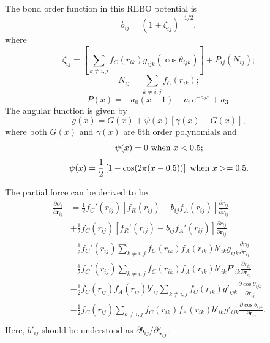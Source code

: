 \documentclass[12pt,a4paper]{report}
\newcommand{\vect}[1]{\boldsymbol{#1}}
\begin{document}
The bond order function in this REBO potential is
\begin{equation}
b_{ij} =\left(1 + \zeta_{ij}\right)^{-1/2},
\end{equation}
where
\begin{equation}
\zeta_{ij} = \left[ \sum_{k\neq i, j} f_C(r_{ik}) g_{ijk}(\cos\theta_{ijk}) \right] + P_{ij}(N_{ij});
\end{equation}
\begin{equation}
N_{ij} = \sum_{k\neq i,j} f_C(r_{ik});
\end{equation}
\begin{equation}
P(x) = -a_0(x-1) - a_1 e^{-a_2x}+a_3.
\end{equation}
The angular function  is given by
\begin{equation}
g(x)= G(x) + \psi(x) [ \gamma(x) - G(x)],
\end{equation}
where both $G(x)$ and $\gamma(x)$ are 6th order polynomials and
\begin{equation}
\psi(x)= 0 ~\textmd{when} ~x < 0.5;
\end{equation}
\begin{equation}
\psi(x)= \frac{1}{2} \left[ 1 - \cos(2\pi(x-0.5)) \right] ~ \textmd{when} ~x >= 0.5.
\end{equation}

The partial force can be derived to be
\begin{align}
\frac{\partial U_i}{\partial \vect{r}_{ij}}
&= \frac{1}{2}f_C'(r_{ij})[f_R(r_{ij})-b_{ij}f_A(r_{ij})]\frac{\partial r_{ij}}{\partial \vect{r}_{ij}} \nonumber \\
&+ \frac{1}{2}f_C(r_{ij})[f_R'(r_{ij})-b_{ij}f_A'(r_{ij})]\frac{\partial r_{ij}}{\partial \vect{r}_{ij}} \nonumber \\
&- \frac{1}{2}f_C'(r_{ij})\sum_{k\neq i,j}f_C(r_{ik})f_A(r_{ik})b'_{ik}g_{ijk} \frac{\partial r_{ij}}{\partial \vect{r}_{ij}} \nonumber \\
&- \frac{1}{2}f_C'(r_{ij})\sum_{k\neq i,j}f_C(r_{ik})f_A(r_{ik})b'_{ik}P'_{ik} \frac{\partial r_{ij}}{\partial \vect{r}_{ij}} \nonumber \\
&- \frac{1}{2}f_C(r_{ij})f_A(r_{ij})b'_{ij}\sum_{k\neq i,j}f_C(r_{ik})  g'_{ijk}
   \frac{\partial \cos\theta_{ijk}}{\partial \vect{r}_{ij}} \nonumber \\
&- \frac{1}{2}f_C(r_{ij})\sum_{k\neq i,j}f_C(r_{ik})f_A(r_{ik})b'_{ik}  g'_{ijk}
   \frac{\partial \cos\theta_{ijk}}{\partial \vect{r}_{ij}}. \nonumber \\
\end{align}
Here, $b'_{ij}$ should be understood as $\partial b_{ij}/\partial \zeta_{ij}$.
\end{document}
